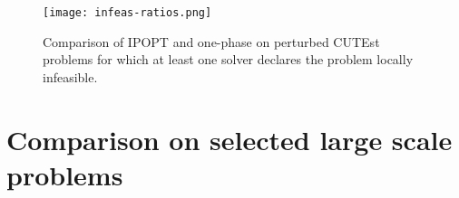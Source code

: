 \documentclass{article}
\begin{document}
\begin{figure}[H]
\texttt{[image: infeas-ratios.png]}
\caption{Comparison of IPOPT and one-phase on perturbed CUTEst problems for which at least one solver declares the problem locally infeasible.}\label{fig:comparison-IPOPT-on-perturbed-CUTEst}
\end{figure}

%
%
%
%

\section{Comparison on selected large scale problems}\label{sec:large-scale}
\newcommand{\NETtimeOnePhase}{100}
\newcommand{\NETtimeIPOPT}{963}
\newcommand{\NETitOnePhase}{26}
\newcommand{\NETitIPOPT}{596}
\end{document}
